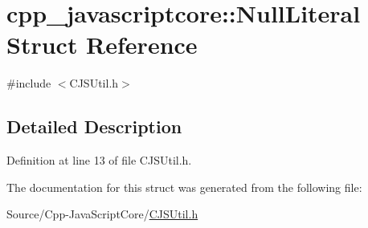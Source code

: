 \hypertarget{structcpp__javascriptcore_1_1_null_literal}{}\section{cpp\+\_\+javascriptcore\+:\+:Null\+Literal Struct Reference}
\label{structcpp__javascriptcore_1_1_null_literal}


{\ttfamily \#include $<$C\+J\+S\+Util.\+h$>$}



\subsection{Detailed Description}


Definition at line 13 of file C\+J\+S\+Util.\+h.



The documentation for this struct was generated from the following file\+:\begin{DoxyCompactItemize}
\item 
Source/\+Cpp-\/\+Java\+Script\+Core/\mbox{\hyperlink{_c_j_s_util_8h}{C\+J\+S\+Util.\+h}}\end{DoxyCompactItemize}

